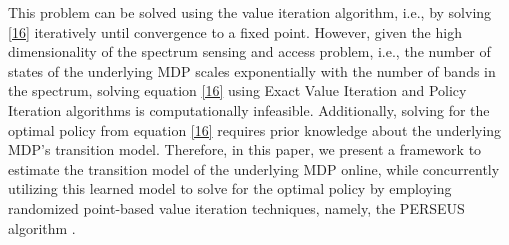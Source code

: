 \documentclass[10pt,twocolumn]{IEEEtran}
\begin{document}
This problem can be solved using the value iteration algorithm, i.e., by solving \eqref{16} iteratively until convergence to a fixed point. However, given the high dimensionality of the spectrum sensing and access problem, i.e., the number of states of the underlying MDP scales exponentially with the number of bands in the spectrum, solving equation \eqref{16} using Exact Value Iteration and Policy Iteration algorithms is computationally infeasible. Additionally, solving for the optimal policy from equation \eqref{16} requires prior knowledge about the underlying MDP's transition model. Therefore, in this paper, we present a framework to estimate the transition model of the underlying MDP online, while concurrently utilizing this learned model to solve for the optimal policy by employing randomized point-based value iteration techniques, namely, the PERSEUS algorithm \cite{DBLP:journals/corr/abs-1109-2145}.
\vspace{-3mm}
\end{document}
